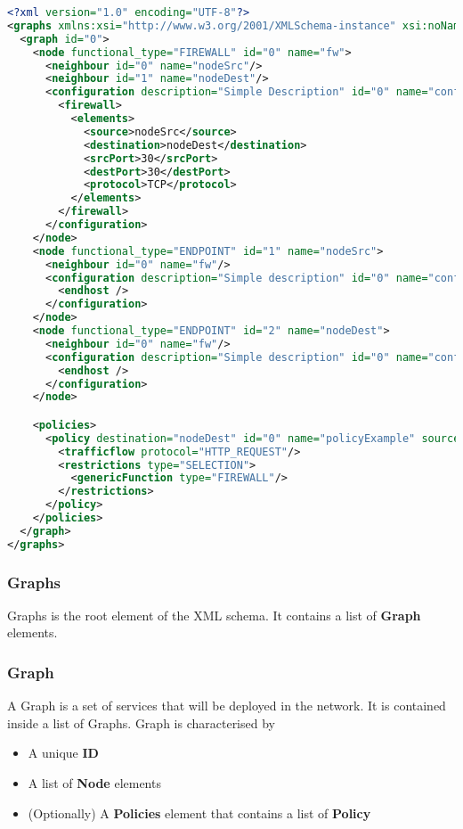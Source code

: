 \begin{lstlisting}[language=XML, caption=XML Example]
<?xml version="1.0" encoding="UTF-8"?>
<graphs xmlns:xsi="http://www.w3.org/2001/XMLSchema-instance" xsi:noNamespaceSchemaLocation="xml_components_v2.xsd">
  <graph id="0">
    <node functional_type="FIREWALL" id="0" name="fw">
      <neighbour id="0" name="nodeSrc"/>
      <neighbour id="1" name="nodeDest"/>
      <configuration description="Simple Description" id="0" name="conf1">
        <firewall>
          <elements>
            <source>nodeSrc</source>
            <destination>nodeDest</destination>
            <srcPort>30</srcPort>
            <destPort>30</destPort>
            <protocol>TCP</protocol>
          </elements>
        </firewall>
      </configuration>
    </node>
    <node functional_type="ENDPOINT" id="1" name="nodeSrc">
      <neighbour id="0" name="fw"/>
      <configuration description="Simple description" id="0" name="conf2">
        <endhost />
      </configuration>
    </node>
    <node functional_type="ENDPOINT" id="2" name="nodeDest">
      <neighbour id="0" name="fw"/>
      <configuration description="Simple description" id="0" name="conf3">
        <endhost />
      </configuration>
    </node>

    <policies>
      <policy destination="nodeDest" id="0" name="policyExample" source="nodeSrc">
        <trafficflow protocol="HTTP_REQUEST"/>
        <restrictions type="SELECTION">
          <genericFunction type="FIREWALL"/>
        </restrictions>
      </policy>
    </policies>
  </graph>
</graphs>
\end{lstlisting}

\subsubsection*{Graphs}
Graphs is the root element of the XML schema. It contains a list of \textbf{Graph} elements.

\subsubsection*{Graph}
A Graph is a set of services that will be deployed in the network. It is contained inside a list of Graphs.
Graph is characterised by
\begin{itemize}
 \item A unique \textbf{ID}
 \item A list of \textbf{Node} elements
 \item (Optionally) A \textbf{Policies} element that contains a list of \textbf{Policy}
\end{itemize}

